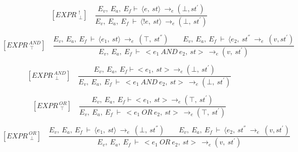 	\[	
	[EXPR^{\ \ !}_{\ \ \bot}] \quad	
	\dfrac{E_v, \ E_a, \ E_f \vdash \ \langle e, \ st \rangle \ \rightarrow_e (\bot, st^{'})}{E_v, \ E_a, \ E_f \ \vdash \ \langle !e, \ st \rangle \ \rightarrow_e (\bot, \ st^{'})}	
	\]
	
	
	
	
	
	
	
	
	\[	
	[EXPR^{\ AND}_{\ \ \top}] \quad	
	\dfrac{E_v, \ E_a, \ E_f \ \vdash \ \langle e_1, \ st \rangle \ \rightarrow_e \ (\top, \ st^{''}) \qquad E_v, \ E_a, \ E_f \ \vdash \ \langle e_2, \ st^{''} \ \rightarrow_e \ (v, st^{'})}{E_v, \ E_a, \ E_f \ \vdash \ <e_1 \ AND \ e_2, \ st> \ \rightarrow_e (v, \ st^{'})}	
	\] 
	
	
	
	
	
	\[	
	[EXPR^{\ AND}_{\ \ \bot}] \quad	
	\dfrac{E_v, \ E_a, \ E_f \vdash <e_1, \ st> \rightarrow_e (\bot, \ st^{'}) }{E_v, \ E_a, \ E_f \ \vdash \ <e_1 \ AND \ e_2, \ st> \ \rightarrow_e (\bot, \ st^{'})}	
	\]
	
	
	
	
	
	
	
	
	\[	
	[EXPR^{\ OR}_{\ \ \top}] \quad	
	\dfrac{E_v, \ E_a, \ E_f \vdash <e_1, \ st> \rightarrow_e (\top, \ st^{'}) }{E_v, \ E_a, \ E_f \ \vdash \ <e_1 \ OR \ e_2, \ st> \ \rightarrow_e (\top, \ st^{'})}	
	\]
	
	
	
	
	
	\[	
	[EXPR^{\ OR}_{\ \ \bot}] \quad	
	\dfrac{E_v, \ E_a, \ E_f \ \vdash \ \langle e_1, \ st \rangle \ \rightarrow_e \ (\bot, \ st^{''}) \qquad E_v, \ E_a, \ E_f \ \vdash \ \langle e_2, \ st^{''} \ \rightarrow_e \ (v, st^{'})}{E_v, \ E_a, \ E_f \ \vdash \ <e_1 \ OR \ e_2, \ st> \ \rightarrow_e (v, \ st^{'})}
	\]
	
	
	
	
	
	
	
	
	
	
	
	
	
